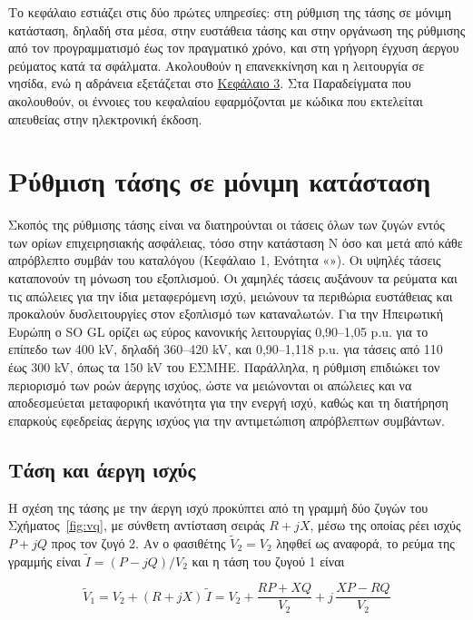 Το κεφάλαιο εστιάζει στις δύο πρώτες υπηρεσίες: στη ρύθμιση της τάσης σε μόνιμη κατάσταση,
δηλαδή στα μέσα, στην ευστάθεια τάσης και στην οργάνωση της ρύθμισης από τον προγραμματισμό
έως τον πραγματικό χρόνο, και στη γρήγορη έγχυση άεργου ρεύματος κατά τα σφάλματα. Ακολουθούν
η επανεκκίνηση και η λειτουργία σε νησίδα, ενώ η αδράνεια εξετάζεται
στο \hyperref[kef-03-theoria]{Κεφάλαιο 3}. Στα Παραδείγματα που ακολουθούν, οι έννοιες του
κεφαλαίου εφαρμόζονται με κώδικα που εκτελείται απευθείας στην ηλεκτρονική έκδοση.

\section{Ρύθμιση τάσης σε μόνιμη κατάσταση}
\label{sec:v-control}

Σκοπός της ρύθμισης τάσης είναι να διατηρούνται οι τάσεις όλων των ζυγών εντός των ορίων
επιχειρησιακής ασφάλειας, τόσο στην κατάσταση N όσο και μετά από κάθε απρόβλεπτο συμβάν του
καταλόγου (Κεφάλαιο 1, Ενότητα «»). Οι υψηλές τάσεις καταπονούν τη μόνωση του
εξοπλισμού. Οι χαμηλές τάσεις αυξάνουν τα ρεύματα και τις απώλειες για την ίδια μεταφερόμενη
ισχύ, μειώνουν τα περιθώρια ευστάθειας και προκαλούν δυσλειτουργίες στον εξοπλισμό των
καταναλωτών. Για την Ηπειρωτική Ευρώπη ο SO GL ορίζει ως εύρος κανονικής λειτουργίας
0,90--1,05 p.u. για το επίπεδο των 400 kV, δηλαδή 360--420 kV, και 0,90--1,118 p.u. για τάσεις
από 110 έως 300 kV, όπως τα 150 kV του ΕΣΜΗΕ. Παράλληλα, η ρύθμιση επιδιώκει τον περιορισμό
των ροών άεργης ισχύος, ώστε να μειώνονται οι απώλειες και να αποδεσμεύεται μεταφορική
ικανότητα για την ενεργή ισχύ, καθώς και τη διατήρηση επαρκούς εφεδρείας άεργης ισχύος για
την αντιμετώπιση απρόβλεπτων συμβάντων.

\subsection{Τάση και άεργη ισχύς}
\label{sec:v-q}

Η σχέση της τάσης με την άεργη ισχύ προκύπτει από τη γραμμή δύο ζυγών του
Σχήματος~\ref{fig:vq}, με σύνθετη αντίσταση σειράς $R + jX$, μέσω της οποίας ρέει ισχύς
$P + jQ$ προς τον ζυγό 2. Αν ο φασιθέτης $\tilde{V}_2 = V_2$ ληφθεί ως αναφορά, το ρεύμα της
γραμμής είναι $\tilde{I} = (P - jQ)/V_2$ και η τάση του ζυγού 1 είναι

\begin{equation}
\tilde{V}_1 = V_2 + (R + jX)\,\tilde{I}
= V_2 + \frac{RP + XQ}{V_2} + j\,\frac{XP - RQ}{V_2}
\label{eq:v1phasor}
\end{equation}

